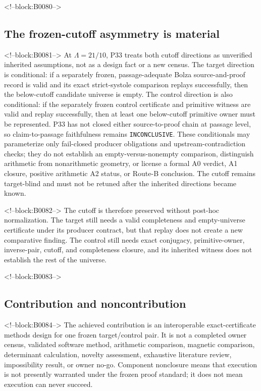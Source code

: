 \documentclass[11pt,a4paper]{article}
\begin{document}
<!--block:B0080-->
\hypertarget{the-frozen-cutoff-asymmetry-is-material}{%
\subsection{The frozen-cutoff asymmetry is material}\label{the-frozen-cutoff-asymmetry-is-material}}

<!--block:B0081-->
At \(\Lambda=21/10\), P33 treats both cutoff directions as unverified inherited assumptions, not as a design fact or a new census. The target direction is conditional: if a separately frozen, passage-adequate Bolza source-and-proof record is valid and its exact strict-systole comparison replays successfully, then the below-cutoff candidate universe is empty. The control direction is also conditional: if the separately frozen control certificate and primitive witness are valid and replay successfully, then at least one below-cutoff primitive owner must be represented. P33 has not closed either source-to-proof chain at passage level, so claim-to-passage faithfulness remains \texttt{INCONCLUSIVE}. These conditionals may parameterize only fail-closed producer obligations and upstream-contradiction checks; they do not establish an empty-versus-nonempty comparison, distinguish arithmetic from nonarithmetic geometry, or license a formal A0 verdict, A1 closure, positive arithmetic A2 status, or Route-B conclusion. The cutoff remains target-blind and must not be retuned after the inherited directions became known.

<!--block:B0082-->
The cutoff is therefore preserved without post-hoc normalization. The target still needs a valid completeness and empty-universe certificate under its producer contract, but that replay does not create a new comparative finding. The control still needs exact conjugacy, primitive-owner, inverse-pair, cutoff, and completeness closure, and its inherited witness does not establish the rest of the universe.

<!--block:B0083-->
\hypertarget{contribution-and-noncontribution}{%
\subsection{Contribution and noncontribution}\label{contribution-and-noncontribution}}

<!--block:B0084-->
The achieved contribution is an interoperable exact-certificate methods design for one frozen target/control pair. It is not a completed owner census, validated software method, arithmetic comparison, magnetic comparison, determinant calculation, novelty assessment, exhaustive literature review, impossibility result, or owner no-go. Component nonclosure means that execution is not presently warranted under the frozen proof standard; it does not mean execution can never succeed.
\end{document}
